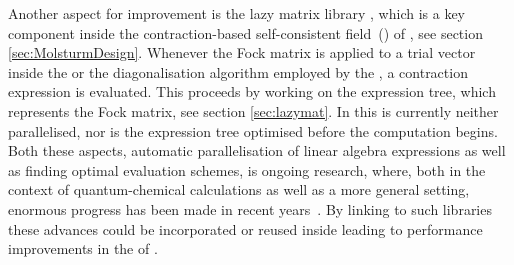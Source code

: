 Another aspect for improvement
is the lazy matrix library \lazyten,
which is a key component inside the contraction-based
self-consistent field~(\SCF) of \molsturm,
see section \ref{sec:MolsturmDesign}.
Whenever the Fock matrix is applied to a trial vector
inside the \SCF or the diagonalisation algorithm
employed by the \SCF,
a contraction expression is evaluated.
This proceeds by working on the expression tree,
which represents the Fock matrix,
see section \ref{sec:lazymat}.
In \lazyten this is currently neither parallelised,
nor is the expression tree optimised before the computation begins.
Both these aspects,
\ie automatic parallelisation of linear algebra expressions
as well as finding optimal evaluation schemes,
is ongoing research,
where, both in the context of quantum-chemical calculations
as well as a more general setting,
enormous progress has been made in recent years~\cite{Baumgartner2005,Solomonik2014,%
Peise2015,Calvin2015,Calvin2015arxiv,Xerus,Kristensen2016array,%
Kristensen2016streaming,Libtensor}.
By linking to such libraries
these advances could be incorporated or reused
inside \lazyten leading to performance improvements in the \SCF of \molsturm.




